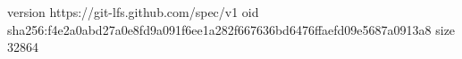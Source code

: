 version https://git-lfs.github.com/spec/v1
oid sha256:f4e2a0abd27a0e8fd9a091f6ee1a282f667636bd6476ffaefd09e5687a0913a8
size 32864
